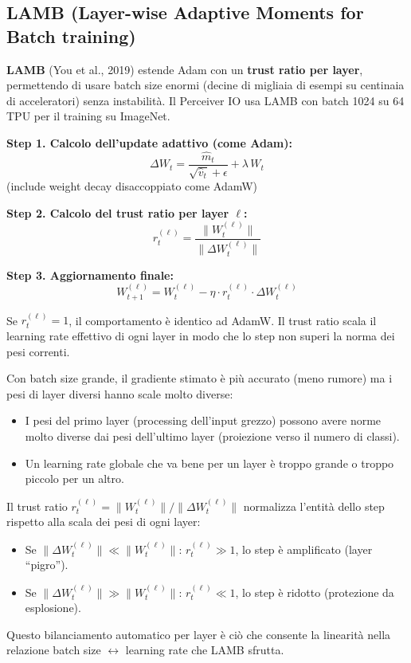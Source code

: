 \documentclass[
  11pt,
]{article}
\begin{document}
\subsection{LAMB (Layer-wise Adaptive Moments for Batch training)}

\textbf{LAMB} (You et al., 2019) estende Adam con un \textbf{trust ratio per layer}, permettendo di usare batch size enormi (decine di migliaia di esempi su centinaia di acceleratori) senza instabilità. Il Perceiver IO usa LAMB con batch 1024 su 64 TPU per il training su ImageNet.

\begin{formulabox}[title={\textbf{LAMB --- Algoritmo}}]
\textbf{Step 1. Calcolo dell'update adattivo (come Adam):}
\[
\Delta W_t = \frac{\hat{m}_t}{\sqrt{\hat{v}_t} + \epsilon} + \lambda\, W_t
\]
(include weight decay disaccoppiato come AdamW)

\textbf{Step 2. Calcolo del trust ratio per layer $\ell$:}
\[
r_t^{(\ell)} = \frac{\|W_t^{(\ell)}\|}{\|\Delta W_t^{(\ell)}\|}
\]

\textbf{Step 3. Aggiornamento finale:}
\[
W_{t+1}^{(\ell)} = W_t^{(\ell)} - \eta \cdot r_t^{(\ell)} \cdot \Delta W_t^{(\ell)}
\]

Se $r_t^{(\ell)} = 1$, il comportamento è identico ad AdamW. Il trust ratio scala il learning rate effettivo di ogni layer in modo che lo step non superi la norma dei pesi correnti.
\end{formulabox}

\begin{notabox}[title={\textbf{Perché il trust ratio abilita il large batch training?}}]
Con batch size grande, il gradiente stimato è più accurato (meno rumore) ma i pesi di layer diversi hanno scale molto diverse:
\begin{itemize}
  \item I pesi del primo layer (processing dell'input grezzo) possono avere norme molto diverse dai pesi dell'ultimo layer (proiezione verso il numero di classi).
  \item Un learning rate globale che va bene per un layer è troppo grande o troppo piccolo per un altro.
\end{itemize}
Il trust ratio $r_t^{(\ell)} = \|W_t^{(\ell)}\| / \|\Delta W_t^{(\ell)}\|$ normalizza l'entità dello step rispetto alla scala dei pesi di ogni layer:
\begin{itemize}
  \item Se $\|\Delta W_t^{(\ell)}\| \ll \|W_t^{(\ell)}\|$: $r_t^{(\ell)} \gg 1$, lo step è amplificato (layer ``pigro'').
  \item Se $\|\Delta W_t^{(\ell)}\| \gg \|W_t^{(\ell)}\|$: $r_t^{(\ell)} \ll 1$, lo step è ridotto (protezione da esplosione).
\end{itemize}
Questo bilanciamento automatico per layer è ciò che consente la linearità nella relazione batch size $\leftrightarrow$ learning rate che LAMB sfrutta.
\end{notabox}
\end{document}

